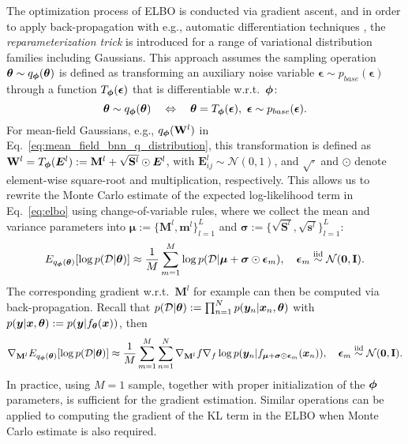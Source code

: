 The optimization process of ELBO is conducted via gradient ascent, and in order to apply back-propagation with e.g., automatic differentiation techniques \citep{auto2018baydin}, the \emph{reparameterization trick} \citep{welling2014auto} is introduced for a range of variational distribution families including Gaussians. This approach assumes the sampling operation $\bm{\theta} \sim q_{\bm{\phi}}(\bm{\theta})$ is defined as transforming an auxiliary noise variable $\bm{\epsilon} \sim p_{base}(\bm{\epsilon})$ through a function $T_{\bm{\phi}}(\bm{\epsilon})$ that is differentiable w.r.t.~$\bm{\phi}$:
%
\begin{equation}
   \mparam \sim q_{\vparam}(\mparam) \quad \Leftrightarrow \quad \mparam = T_{\vparam}(\bm{\epsilon}), \ \bm{\epsilon} \sim p_{base}(\bm{\epsilon}).
\end{equation}
%
For mean-field Gaussians, e.g., $q_{\bm{\phi}}(\mathbf{W}^l)$ in Eq.~\eqref{eq:mean_field_bnn_q_distribution}, this transformation is defined as $\mathbf{W}^l = T_{\bm{\phi}}(\bm{E}^l) := \mathbf{M}^l + \sqrt{\mathbf{S}^l} \odot \bm{E}^l$, with $\bm{E}^l_{ij} \sim \mathcal{N}(0, 1)$, and $\sqrt{\cdot}$ and $\odot$ denote element-wise square-root and multiplication, respectively. This allows us to rewrite the Monte Carlo estimate of the expected log-likelihood term in Eq.~\eqref{eq:elbo} using change-of-variable rules, where we collect the mean and variance parameters into $\bm{\mu} := \{\mathbf{M}^l, \mathbf{m}^l \}_{l=1}^L$ and $\bm{\sigma} := \{\sqrt{\mathbf{S}^l}, \sqrt{\mathbf{s}^l} \}_{l=1}^L$:
\begin{equation}
    E_{q_{\bm{\phi}}(\bm{\theta})}[\log p(\mathcal{D}|\bm{\theta})] \approx \frac{1}{M} \sum_{m=1}^M \log p(\mathcal{D}|\bm{\mu} + \bm{\sigma} \odot \bm{\epsilon}_m), \quad \bm{\epsilon}_m \stackrel{\text{iid}}{\sim} \mathcal{N}(\bm{0}, \mathbf{I}).
\end{equation}
The corresponding gradient w.r.t.~$\mathbf{M}^l$ for example can then be computed via back-propagation. Recall that $p(\mathcal{D}|\bm{\theta}) := \prod_{n=1}^N p(\bm{y}_n | \bm{x}_n, \bm{\theta})$ with $p(\bm{y} | \bm{x}, \bm{\theta}) := p(\bm{y} | f_{\bm{\theta}}(\bm{x}))$, then
$$\nabla_{\mathbf{M}^l} E_{q_{\bm{\phi}}(\bm{\theta})}[\log p(\mathcal{D}|\bm{\theta})] \approx \frac{1}{M} \sum_{m=1}^M \sum_{n=1}^N \nabla_{\mathbf{M}^l} f \nabla_f \log p(\bm{y}_n| f_{\bm{\mu} + \bm{\sigma} \odot \bm{\epsilon}_m}(\bm{x}_n)), \quad \bm{\epsilon}_m \stackrel{\text{iid}}{\sim} \mathcal{N}(\bm{0}, \mathbf{I}).$$
In practice, using $M=1$ sample, together with proper initialization of the $\bm{\phi}$ parameters, is sufficient for the gradient estimation.
Similar operations can be applied to computing the gradient of the KL term in the ELBO when Monte Carlo estimate is also required.

